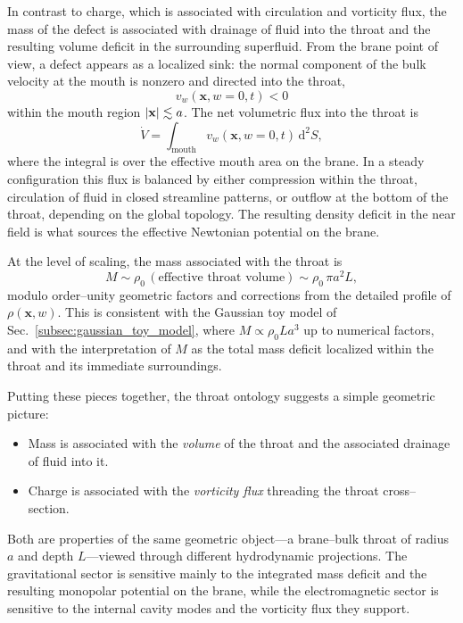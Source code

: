 \documentclass[12pt]{article}
\begin{document}
In contrast to charge, which is associated with circulation and vorticity
flux, the mass of the defect is associated with drainage of fluid into the
throat and the resulting volume deficit in the surrounding superfluid.  From
the brane point of view, a defect appears as a localized sink: the normal
component of the bulk velocity at the mouth is nonzero and directed into
the throat,
\begin{equation}
  v_w(\mathbf{x},w=0,t) < 0
\end{equation}
within the mouth region $\abs{\mathbf{x}}\lesssim a$.  The net volumetric
flux into the throat is
\begin{equation}
  \dot{V}
  = \int_{\mathrm{mouth}}
      v_w(\mathbf{x},w=0,t)\,\mathrm{d}^2S,
\end{equation}
where the integral is over the effective mouth area on the brane.  In a
steady configuration this flux is balanced by either compression within the
throat, circulation of fluid in closed streamline patterns, or outflow at
the bottom of the throat, depending on the global topology.  The resulting
density deficit in the near field is what sources the effective Newtonian
potential on the brane.

At the level of scaling, the mass associated with the throat is
\begin{equation}
  M \sim \rho_0 \,(\text{effective throat volume})
    \sim \rho_0 \,\pi a^2 L,
\end{equation}
modulo order--unity geometric factors and corrections from the detailed
profile of $\rho(\mathbf{x},w)$.  This is consistent with the Gaussian toy
model of Sec.~\ref{subsec:gaussian_toy_model}, where $M\propto \rho_0 L a^3$
up to numerical factors, and with the interpretation of $M$ as the total
mass deficit localized within the throat and its immediate surroundings.

Putting these pieces together, the throat ontology suggests a simple
geometric picture:
\begin{itemize}
  \item Mass is associated with the \emph{volume} of the throat and the
        associated drainage of fluid into it.
  \item Charge is associated with the \emph{vorticity flux} threading the
        throat cross--section.
\end{itemize}
Both are properties of the same geometric object---a brane--bulk throat of
radius $a$ and depth $L$---viewed through different hydrodynamic
projections.  The gravitational sector is sensitive mainly to the integrated
mass deficit and the resulting monopolar potential on the brane, while the
electromagnetic sector is sensitive to the internal cavity modes and the
vorticity flux they support.
\end{document}

